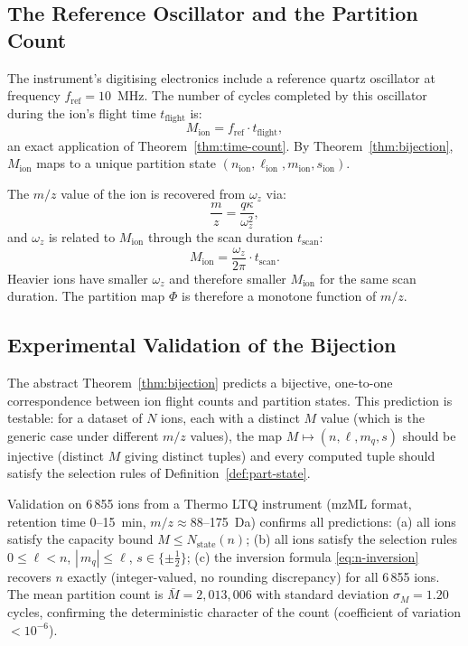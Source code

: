 \documentclass[twocolumn,10pt,a4paper]{article}
\theoremstyle{thmstyle}
\theoremstyle{definition}
\theoremstyle{remark}
\newcommand{\Nstate}{N_{\mathrm{state}}}
\newcommand{\PhiMap}{\varPhi}
\begin{document}
\subsection{The Reference Oscillator and the Partition Count}

The instrument's digitising electronics include a reference quartz oscillator at frequency $f_{\mathrm{ref}} = 10$~MHz. The number of cycles completed by this oscillator during the ion's flight time $t_{\mathrm{flight}}$ is:
\begin{equation}
    M_{\mathrm{ion}} = f_{\mathrm{ref}} \cdot t_{\mathrm{flight}},
\end{equation}
an exact application of Theorem~\ref{thm:time-count}. By Theorem~\ref{thm:bijection}, $M_{\mathrm{ion}}$ maps to a unique partition state $(n_{\mathrm{ion}}, \ell_{\mathrm{ion}}, m_{\mathrm{ion}}, s_{\mathrm{ion}})$.

The $m/z$ value of the ion is recovered from $\omega_z$ via:
\begin{equation}
    \frac{m}{z} = \frac{q\kappa}{\omega_z^2},
\end{equation}
and $\omega_z$ is related to $M_{\mathrm{ion}}$ through the scan duration $t_{\mathrm{scan}}$:
\begin{equation}
    M_{\mathrm{ion}} = \frac{\omega_z}{2\pi}\cdot t_{\mathrm{scan}}.
\end{equation}
Heavier ions have smaller $\omega_z$ and therefore smaller $M_{\mathrm{ion}}$ for the same scan duration. The partition map $\PhiMap$ is therefore a monotone function of $m/z$.

\subsection{Experimental Validation of the Bijection}

The abstract Theorem~\ref{thm:bijection} predicts a bijective, one-to-one correspondence between ion flight counts and partition states. This prediction is testable: for a dataset of $N$ ions, each with a distinct $M$ value (which is the generic case under different $m/z$ values), the map $M \mapsto (n, \ell, m_q, s)$ should be injective (distinct $M$ giving distinct tuples) and every computed tuple should satisfy the selection rules of Definition~\ref{def:part-state}.

Validation on 6\,855 ions from a Thermo LTQ instrument (mzML format, retention time 0--15~min, $m/z \approx 88$--175~Da) confirms all predictions: (a) all ions satisfy the capacity bound $M \leq \Nstate(n)$; (b) all ions satisfy the selection rules $0 \leq \ell < n$, $|\,m_q| \leq \ell$, $s \in \{\pm\tfrac{1}{2}\}$; (c) the inversion formula \eqref{eq:n-inversion} recovers $n$ exactly (integer-valued, no rounding discrepancy) for all 6\,855 ions. The mean partition count is $\bar{M} = 2{,}013{,}006$ with standard deviation $\sigma_M = 1.20$ cycles, confirming the deterministic character of the count (coefficient of variation $< 10^{-6}$).
\end{document}

